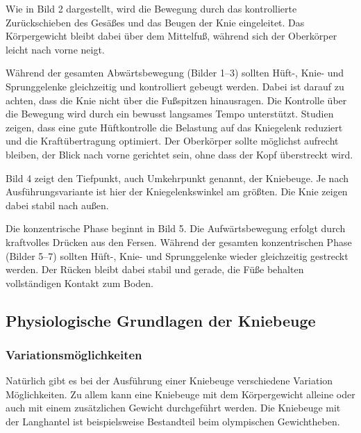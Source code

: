 \noindent Wie in Bild 2 dargestellt, wird die Bewegung durch das kontrollierte Zurückschieben des Gesäßes und das Beugen der Knie eingeleitet. Das Körpergewicht bleibt dabei über dem Mittelfuß, während sich der Oberkörper leicht nach vorne neigt. \cite{schoenfeld2010kinematics}

\noindent Während der gesamten Abwärtsbewegung (Bilder 1–3) sollten Hüft-, Knie- und Sprunggelenke gleichzeitig und kontrolliert gebeugt werden. Dabei ist darauf zu achten, dass die Knie nicht über die Fußspitzen hinausragen. \cite{Meinart} Die Kontrolle über die Bewegung wird durch ein bewusst langsames Tempo unterstützt. Studien zeigen, dass eine gute Hüftkontrolle die Belastung auf das Kniegelenk reduziert und die Kraftübertragung optimiert. \cite{schoenfeld2010kinematics} Der Oberkörper sollte möglichst aufrecht bleiben, der Blick nach vorne gerichtet sein, ohne dass der Kopf überstreckt wird. \cite{Meinart}

\noindent Bild 4 zeigt den Tiefpunkt, auch Umkehrpunkt genannt, der Kniebeuge. Je nach Ausführungsvariante ist hier der Kniegelenkswinkel am größten. Die Knie zeigen dabei stabil nach außen. \cite{Meinart}

\noindent Die konzentrische Phase beginnt in Bild 5. Die Aufwärtsbewegung erfolgt durch kraftvolles Drücken aus den Fersen. \cite{schoenfeld2010kinematics} Während der gesamten konzentrischen Phase (Bilder 5–7) sollten Hüft-, Knie- und Sprunggelenke wieder gleichzeitig gestreckt werden. Der Rücken bleibt dabei stabil und gerade, die Füße behalten vollständigen Kontakt zum Boden. \cite{Meinart}

\subsection{Physiologische Grundlagen der Kniebeuge}
\subsubsection{Variationsmöglichkeiten}
\nointent Natürlich gibt es bei der Ausführung einer Kniebeuge verschiedene Variation Möglichkeiten. Zu allem kann eine Kniebeuge mit dem Körpergewicht alleine oder auch mit einem zusätzlichen Gewicht durchgeführt werden. Die Kniebeuge mit der Langhantel ist beispielsweise Bestandteil beim olympischen Gewichtheben. 

